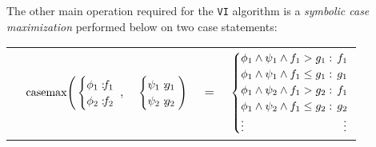 The other main operation required for the \texttt{VI} algorithm is a \emph{symbolic case maximization} performed below on two case statements:
\vspace{-6mm}
{\footnotesize
\begin{center}
\begin{tabular}{r c c c l}
&
\hspace{-7mm} $\casemax \Bigg(
  \begin{cases}
    \phi_1: \hspace{-2mm} & \hspace{-2mm} f_1 \\ 
    \phi_2: \hspace{-2mm} & \hspace{-2mm} f_2 \\ 
  \end{cases}$
$,$
&
\hspace{-4mm}
  $\begin{cases}
    \psi_1: \hspace{-2mm} & \hspace{-2mm} g_1 \\ 
    \psi_2: \hspace{-2mm} & \hspace{-2mm} g_2 \\ 
  \end{cases} \Bigg)$
&
\hspace{-4mm} 
$ = $
&
\hspace{-4mm}
  $\begin{cases}
  \phi_1 \wedge \psi_1 \wedge f_1 > g_1    : & \hspace{-2mm} f_1 \\ 
  \phi_1 \wedge \psi_1 \wedge f_1 \leq g_1 : & \hspace{-2mm} g_1 \\ 
  \phi_1 \wedge \psi_2 \wedge f_1 > g_2    : & \hspace{-2mm}f_1 \\ 
  \phi_1 \wedge \psi_2 \wedge f_1 \leq g_2 : & \hspace{-2mm} g_2 \\ 
 \vdots & \vdots
  \end{cases}$
\end{tabular}
\end{center}
} \vspace{-2mm}
